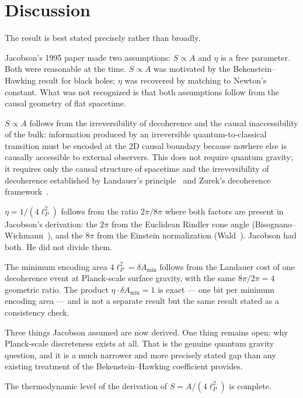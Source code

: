 \documentclass[12pt,a4paper]{article}
\begin{document}
\section{Discussion}
\label{sec:discussion}

The result is best stated precisely rather than broadly.

Jacobson's 1995 paper made two assumptions: $S \propto A$ and
$\eta$ is a free parameter. Both were reasonable at the time.
$S \propto A$ was motivated by the Bekenstein--Hawking result for
black holes; $\eta$ was recovered by matching to Newton's constant.
What was not recognized is that both assumptions follow from the
causal geometry of flat spacetime.

$S \propto A$ follows from the irreversibility of decoherence and
the causal inaccessibility of the bulk: information produced by an
irreversible quantum-to-classical transition must be encoded at the
2D causal boundary because nowhere else is causally accessible to
external observers. This does not require quantum gravity; it
requires only the causal structure of spacetime and the
irreversibility of decoherence established by Landauer's
principle~\citep{Landauer1961} and Zurek's decoherence
framework~\citep{Zurek2003}.

$\eta = 1/(4\ell_P^2)$ follows from the ratio $2\pi/8\pi$ where
both factors are present in Jacobson's derivation: the $2\pi$ from
the Euclidean Rindler cone angle (Bisognano--Wichmann~\citep{Bisognano1976}),
and the $8\pi$ from the Einstein normalization (Wald~\citep{Wald1984}).
Jacobson had both. He did not divide them.

The minimum encoding area $4\ell_P^2 = \delta A_\mathrm{min}$
follows from the Landauer cost of one decoherence event at
Planck-scale surface gravity, with the same $8\pi/2\pi = 4$
geometric ratio. The product $\eta \cdot \delta A_\mathrm{min} = 1$
is exact --- one bit per minimum encoding area --- and is not a
separate result but the same result stated as a consistency check.

Three things Jacobson assumed are now derived. One thing remains
open: why Planck-scale discreteness exists at all. That is the
genuine quantum gravity question, and it is a much narrower and
more precisely stated gap than any existing treatment of the
Bekenstein--Hawking coefficient provides.

The thermodynamic level of the derivation of $S = A/(4\ell_P^2)$
is complete.
\end{document}
